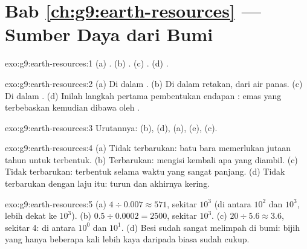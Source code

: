 \section*{Bab \ref{ch:g9:earth-resources} --- Sumber Daya dari Bumi}

\begin{solution}{exo:g9:earth-resources:1}
(a) . (b) . (c) . (d) .
\end{solution}

\begin{solution}{exo:g9:earth-resources:2}
(a) Di dalam  . (b) Di dalam retakan, dari air panas. (c) Di
dalam . (d) Inilah langkah pertama pembentukan endapan 
: emas yang terbebaskan kemudian dibawa oleh .
\end{solution}

\begin{solution}{exo:g9:earth-resources:3}
Urutannya: (b), (d), (a), (e), (c).
\end{solution}

\begin{solution}{exo:g9:earth-resources:4}
(a) Tidak terbarukan: batu bara memerlukan jutaan tahun untuk terbentuk.
(b) Terbarukan:  mengisi kembali apa yang diambil. (c) Tidak
terbarukan:  terbentuk selama waktu yang sangat panjang.
(d) Tidak terbarukan dengan laju itu:  turun dan
 akhirnya kering.
\end{solution}

\begin{solution}{exo:g9:earth-resources:5}
(a) $4 \div 0.007 \approx 571$, sekitar $10^3$ (di antara $10^2$ dan
$10^3$, lebih dekat ke $10^3$). (b) $0.5 \div 0.0002 = 2500$, sekitar
$10^3$. (c) $20
\div 5.6 \approx 3.6$, sekitar 4: di antara $10^0$ dan $10^1$.
(d) Besi sudah sangat melimpah di  bumi: bijih yang hanya beberapa
kali lebih kaya daripada  biasa sudah cukup.
\end{solution}

